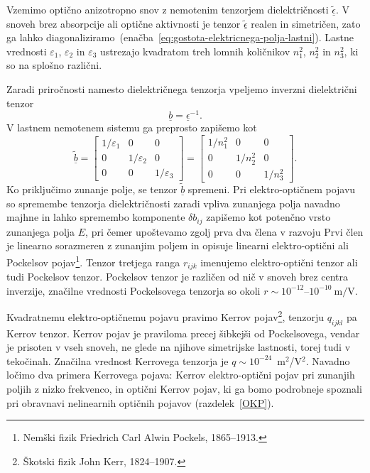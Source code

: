 Vzemimo optično anizotropno snov z nemotenim tenzorjem dielektričnosti 
$\underline{\tilde{\epsilon}}$. V snoveh brez absorpcije ali optične aktivnosti
je tenzor $\underline{\tilde{\epsilon}}$ realen in simetričen, zato ga lahko 
diagonaliziramo~(enačba~\ref{eq:gostota-elektricnega-polja-lastni}). Lastne vrednosti 
$\varepsilon_1$, $\varepsilon_2$ in $\varepsilon_3$ ustrezajo kvadratom treh lomnih
količnikov $n_1^2$, $n_2^2$ in $n_3^2$, ki so na splošno različni.

Zaradi priročnosti namesto dielektričnega tenzorja 
vpeljemo inverzni dielektrični tenzor
\begin{equation}
\underline{b}=\underline{\epsilon}^{-1}.
\end{equation}
V lastnem nemotenem sistemu ga preprosto zapišemo kot
\begin{equation}
\underline{\tilde{b}} = \left[\begin{array}{ccc}
1/\varepsilon_1 & 0& 0\\
0 & 1/\varepsilon_2& 0\\
0 & 0&  1/\varepsilon_3
\end{array}\right] = 
\left[\begin{array}{ccc}
1/n_1^2 & 0& 0\\
0 & 1/n_2^2& 0\\
0 & 0&  1/n_3^2
\end{array}\right].
\end{equation}
Ko priključimo zunanje polje, se tenzor $\underline{\tilde{b}}$
spremeni. Pri elektro-optičnem pojavu so spremembe tenzorja dielektričnosti zaradi vpliva
zunanjega polja navadno majhne in lahko spremembo komponente $\delta b_{ij}$ zapišemo kot 
potenčno vrsto zunanjega polja $E$, 
pri čemer upoštevamo zgolj prva dva člena v razvoju
Prvi člen je linearno sorazmeren z zunanjim poljem in opisuje linearni elektro-optični
ali Pockelsov pojav\footnote{Nemški fizik Friedrich Carl Alwin Pockels, 1865--1913.}. 
Tenzor tretjega ranga $r_{ijk}$ imenujemo elektro-optični 
tenzor
ali tudi Pockelsov tenzor. 
Pockelsov tenzor je različen od nič v snoveh brez centra inverzije, značilne vrednosti Pockelsovega
tenzorja so okoli $r \sim 10^{-12}$--$10^{-10}~\si{\m/\V}$.

Kvadratnemu elektro-optičnemu pojavu pravimo Kerrov
pojav\footnote{Škotski fizik John Kerr, 1824--1907.}, tenzorju $q_{ijkl}$ 
pa Kerrov tenzor. Kerrov pojav je praviloma precej šibkejši od Pockelsovega, vendar je prisoten 
v vseh snoveh, ne glede na njihove simetrijske lastnosti, torej tudi v tekočinah. 
Značilna vrednost Kerrovega tenzorja je $q \sim 10^{-24}$~m$^2$/V$^2$. 
Navadno ločimo dva primera Kerrovega pojava: Kerrov elektro-optični pojav 
pri zunanjih poljih z nizko frekvenco, in optični Kerrov pojav, ki ga bomo  
podrobneje spoznali pri obravnavi nelinearnih optičnih pojavov (razdelek~\ref{OKP}).

